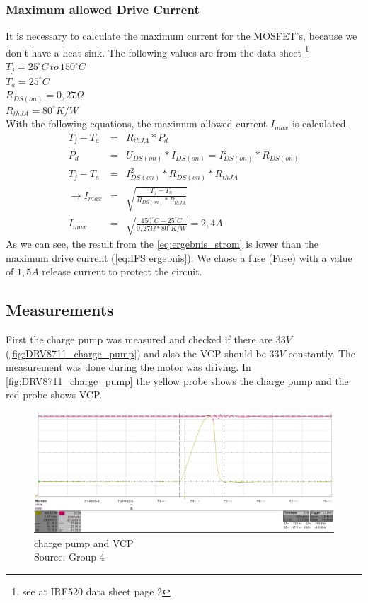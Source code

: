 \documentclass[a4paper,12pt]{scrreprt}
\begin{document}
\subsubsection{Maximum allowed Drive Current}
It is necessary to calculate the maximum current for the \acs{MOSFET}'s, because we don't have a heat sink.
The following values are from the data sheet \footnote{see at IRF520 data sheet page 2}\\
$T_{j}=25^{\circ}C \, to \, 150^{\circ}C$\\
$T_{a}=25^{\circ}C$\\
$R_{DS(on)}=0,27\Omega$\\
$R_{thJA}=80^{\circ}K/W$\\
With the following equations, the maximum allowed current $I_{max}$ is calculated.
\begin{eqnarray}
T_{j}-T_{a}&=&R_{thJA}*P_{d}\\
P_{d}&=&U_{DS(on)}*I_{DS(on)}=I_{DS(on)}^{2}*R_{DS(on)}\\
T_{j}-T_{a}&=&I_{DS(on)}^{2}*R_{DS(on)}*R_{thJA}       \\
\rightarrow I_{max}&=&\sqrt{\frac{T_{j}-T_{a}}{R_{DS(on)}*R_{thJA}}}\\
 I_{max}&=&\sqrt{\frac{150^{\circ}C-25^{\circ}C}{0,27 \Omega * 80^{\circ}K/W}}=2,4A\label{eq:ergebnis_strom}
\end{eqnarray}
As we can see, the result from the \autoref{eq:ergebnis_strom} is lower than the maximum drive current (\autoref{eq:IFS ergebnis}). We chose a fuse (Fuse) with a value of $1,5A$ release current to protect the circuit.

\subsection{Measurements}
First the charge pump was measured and checked if there are $33V$ (\autoref{fig:DRV8711_charge_pump}) and also the \acs{VCP} should be $33V$ constantly. The measurement was done during the motor was driving. In \autoref{fig:DRV8711_charge_pump} the yellow probe shows the charge pump and the red probe shows \acs{VCP}.

\begin{figure}[H]
  \centering
   \includegraphics[width=1\textwidth]{pictures/measurements/DRV8711_charge_pump}
   \caption[Charge pump and \acs{VCP}]{charge pump and \acs{VCP}\\
	Source: Group 4  
  }
   \label{fig:DRV8711_charge_pump}
\end{figure}
\end{document}
